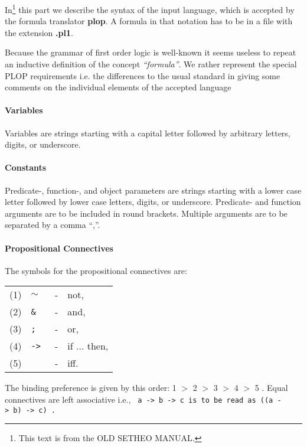 In\footnote{This text is from the OLD SETHEO MANUAL.}
 this part we describe the syntax of the input language, which is
accepted by the formula translator {\bf plop}.
A formula in that notation has to be in a file with the extension {\bf .pl1}.

Because the grammar of first order logic is well-known it seems
useless to repeat an inductive definition of the concept 
{\em ``formula''}. We rather represent the special PLOP
requirements i.e. the differences to the usual
standard in giving some comments on the individual
elements of the accepted language

\paragraph{Variables}
Variables are strings starting with a capital letter followed 
by arbitrary letters, digits, or underscore.

\paragraph{Constants}
Predicate-, function-, and object parameters are strings starting 
with a lower case letter followed by lower case letters, digits, or underscore. 
Predicate- and function arguments are to be included in round brackets.
Multiple arguments are to be separated by a comma ``,''.

\paragraph{Propositional Connectives}
The symbols for the propositional connectives are:

\begin{center}
\begin{tabular}{llll}
(1) &  {\tt $\sim$}  &   - &  not, \\
(2)  &	 {\tt \& } & -  & and, \\
(3)   &{\tt ; } & -  & or, \\
(4)   &{\tt -> } & -  & if ... then, \\
(5) & 	 {\tt <->}  & -  & iff. 
\end{tabular}                  
\end{center}

The binding preference is given by this order:
1 $>$ 2 $>$ 3 $>$ 4 $>$ 5 . 
Equal connectives are left associative i.e.,
\tt 
\mbox{a -> b -> c} \rm is to be read as \tt \mbox{((a -> b) -> c)} 
\rm .

